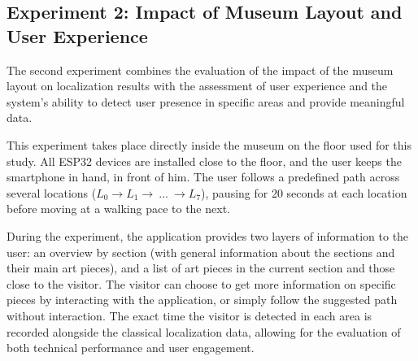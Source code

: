 \subsection{Experiment 2: Impact of Museum Layout and User Experience}
\label{exp:2_museum}

The second experiment combines the evaluation of the impact of the museum layout on localization results with the assessment of user experience and the system's ability to detect user presence in specific areas and provide meaningful data.

This experiment takes place directly inside the museum on the floor used for this study. All ESP32 devices are installed close to the floor, and the user keeps the smartphone in hand, in front of him. The user follows a predefined path across several locations ($L_0 \rightarrow L_1 \rightarrow~...~\rightarrow L_7$), pausing for 20 seconds at each location before moving at a walking pace to the next.

During the experiment, the application provides two layers of information to the user: an overview by section (with general information about the sections and their main art pieces), and a list of art pieces in the current section and those close to the visitor. The visitor can choose to get more information on specific pieces by interacting with the application, or simply follow the suggested path without interaction. The exact time the visitor is detected in each area is recorded alongside the classical localization data, allowing for the evaluation of both technical performance and user engagement.

